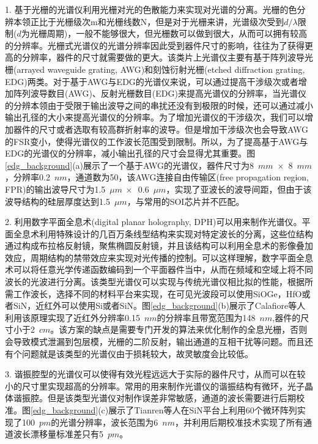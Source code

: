 1. 基于光栅的光谱仪利用光栅对光的色散能力来实现对光谱的分离。光栅的色分辨本领正比于光栅级次m和光栅线数N，但是对于光栅来讲，光谱级次受到$d/\lambda$限制($d$为光栅周期)，一般不能够很大，但光栅数可以做到很大，从而可以拥有较高的分辨率。光栅式光谱仪的光谱分辨率因此受到器件尺寸的影响，往往为了获得更高的分辨率，器件的尺寸就需要做的更大。该类片上光谱仪主要有基于阵列波导光栅(arrayed waveguide grating, AWG)和刻蚀衍射光栅(etched diffraction grating, EDG)两类。对于基于AWG与EDG的光谱仪来说，可以通过提高干涉级次或者增加阵列波导数目(AWG)、反射光栅数目(EDG)来提高光谱仪的分辨率，当光谱仪的分辨本领由于受限于输出波导之间的串扰还没有到极限的时候，还可以通过减小输出孔径的大小来提高光谱仪的分辨率。为了增加光谱仪的干涉级次，我们可以增加器件的尺寸或者选取有较高群折射率的波导\cite{matos2006arrayed}。但是增加干涉级次也会导致AWG的FSR变小，使得光谱仪的工作波长范围受到限制。所以，为了提高基于AWG与EDG的光谱仪的分辨率，减小输出孔径的尺寸会显得尤其重要。图\ref{edg_background}(a)展示了一个基于AWG的光谱仪，器件尺寸为8~$mm$~$\times$~8~$mm$，分辨率0.2~$nm$，通道数为50\cite{cheben2007high}，该AWG连接自由传输区(free propagation region, FPR)的输出波导尺寸为1.5~$\mu m~\times$~0.6~$\mu m$，实现了亚波长的波导间距，但由于该波导结构的硅层厚度达到1.5~$\mu m$，与常用的SOI芯片并不匹配。

2. 利用数字平面全息术(digital planar holography, DPH)可以用来制作光谱仪\cite{peroz2012multiband}。平面全息术利用特殊设计的几百万条线型结构来实现对特定波长的分离，这些位结构通过构成布拉格反射镜，聚焦椭圆反射镜，并且该结构可以利用全息术的影像叠加效应，周期结构的禁带效应来实现对光传播的控制。可以这样理解，数字平面全息术可以将任意光学传递函数编码到一个平面器件当中，从而在频域和空域上将不同波长的光波进行分离。该类型光谱仪可以实现与传统光谱仪相比拟的性能，根据所需工作波长，选择不同的材料平台来实现，在可见光波段可以使用SiOGe，HfO或者SiN，近红外可以使用Si或者SiN。图\ref{edg_background}(b)展示了Calafiore等人利用该原理实现了近红外分辨率0.15~$nm$的分辨率且带宽范围为148~$nm$,器件的尺寸小于2~$cm$\cite{calafiore2014holographic}。该方案的缺点是需要专门开发的算法来优化制作的全息光栅，否则会导致模式泄漏到包层模，光栅的二阶反射，输出通道的互相干扰等问题。而且还有个问题就是该类型的光谱仪由于损耗较大，故灵敏度会比较低。

3. 谐振腔型的光谱仪可以使得有效光程远远大于实际的器件尺寸，从而可以在较小的尺寸里实现超高的分辨率。常用的用来制作光谱仪的谐振结构有微环，光子晶体谐振腔。但是该类型光谱仪对制作误差非常敏感，通道的波长需要进行后期校准。图\ref{edg_background}(c)展示了Tianren等人在SiN平台上利用60个微环阵列实现了100~$pm$的光谱分辨率，波长范围为6~$nm$，并利用后期校准技术实现了所有通道波长漂移量标准差只有5~$pm$\cite{fan2018highly}。

